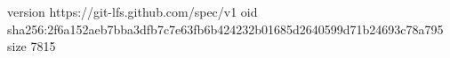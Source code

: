 version https://git-lfs.github.com/spec/v1
oid sha256:2f6a152aeb7bba3dfb7c7e63fb6b424232b01685d2640599d71b24693c78a795
size 7815
